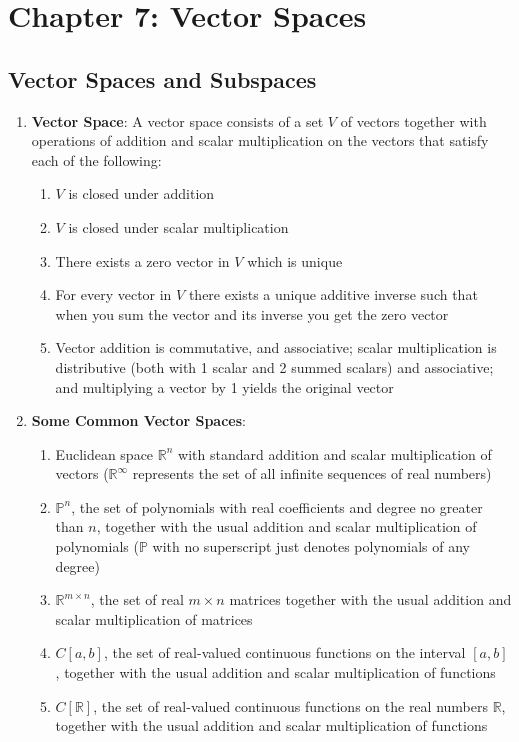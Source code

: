 \documentclass[10pt]{article}
\begin{document}
\section{Chapter 7: Vector Spaces}
\subsection{Vector Spaces and Subspaces}
\begin{enumerate}
\item \textbf{Vector Space}: A vector space consists of a set $V$ of vectors together with operations of addition and scalar multiplication on the vectors that satisfy each of the following:
\begin{enumerate}
\item $V$ is closed under addition
\item $V$ is closed under scalar multiplication
\item There exists a zero vector in $V$ which is unique
\item For every vector in $V$ there exists a unique additive inverse such that when you sum the vector and its inverse you get the zero vector
\item Vector addition is commutative, and associative; scalar multiplication is distributive (both with 1 scalar and 2 summed scalars) and associative; and multiplying a vector by 1 yields the original vector
\end{enumerate}
\item \textbf{Some Common Vector Spaces}: 
\begin{enumerate}
\item Euclidean space $\mathbb{R}^n$ with standard addition and scalar multiplication of vectors ($\mathbb{R}^\infty$ represents the set of all infinite sequences of real numbers)
\item $\mathbb{P}^n$, the set of polynomials with real coefficients and degree no greater than $n$, together with the usual addition and scalar multiplication of polynomials ($\mathbb{P}$ with no superscript just denotes polynomials of any degree)
\item $\mathbb{R}^{m \times n}$, the set of real $m \times n$ matrices together with the usual addition and scalar multiplication of matrices
\item $C[a,b]$, the set of real-valued continuous functions on the interval $[a,b]$, together with the usual addition and scalar multiplication of functions
\item $C[\mathbb{R}]$, the set of real-valued continuous functions on the real numbers $\mathbb{R}$, together with the usual addition and scalar multiplication of functions

\end{enumerate}
\end{enumerate}
\end{document}
